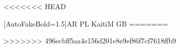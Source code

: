 \usepackage{xcoffins} %
\usepackage{xcolor}
<<<<<<< HEAD
\usepackage{xeCJK} %
\usepackage{soul} %
\setul{}{2pt}
\setmainfont{Times New Roman} %
[AutoFakeBold=1.5]{AR PL KaitiM GB}
\newcommand{\kaiti}{\CJKfamily{kaiti}}
=======
\usepackage{soul} %
\setul{}{2pt}
>>>>>>> 496ecbff5aa4e156d201e8e9ef86f7cf7618ffb9
